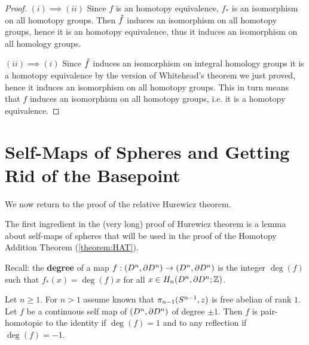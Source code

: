 \begin{proof}
$(i)\implies(ii)$ Since $f$ is an homotopy equivalence, $f_*$ is an isomorphism on all homotopy groups. Then $\tilde{f}$ induces an isomorphism on all homotopy groups, hence it is an homotopy equivalence, thus it induces an isomorphism on all homology groups.

$(ii)\implies(i)$ Since $\tilde{f}$ induces an isomorphism on integral homology groups it is a homotopy equivalence by the version of Whitehead's theorem we just proved, hence it induces an isomorphism on all homotopy groups. This in turn means that $f$ induces an isomorphism on all homotopy groups, i.e. it is a homotopy equivalence.
\end{proof}

\section{Self-Maps of Spheres and Getting Rid of the Basepoint}

We now return to the proof of the relative Hurewicz theorem.

The first ingredient in the (very long) proof of Hurewicz theorem is a lemma about self-maps of spheres that will be used in the proof of the Homotopy Addition Theorem (\ref{theorem:HAT}).

Recall: the \textbf{degree} of a map $f:(D^n,\partial D^n)\to(D^n,\partial D^n)$ is the integer $\deg(f)$ such that $f_*(x)=\deg(f)x$ for all $x\in H_n(D^n,\partial D^n;{\mathbb Z})$.

\begin{lemma}\label{lemma:degree-of-sphere-self-maps}
Let $n\geq1$. For $n>1$ assume known that $\pi_{n-1}(S^{n-1},z)$ is free abelian of rank $1$. Let $f$ be a continuous self map of $(D^n,\partial D^n)$ of degree $\pm 1$. Then $f$ is pair-homotopic to the identity if $\deg(f)=1$ and to any reflection if $\deg(f)=-1$.
\end{lemma}

